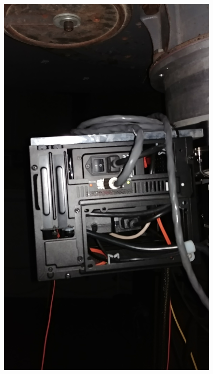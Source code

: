 \documentclass[12pt]{article}
\begin{document}
\begin{figure}[t!]
  \centering
  \begin{minipage}[b]{0.49\textwidth}
    \includegraphics[width=\textwidth]{power.jpg}
  \end{minipage}
  \hfill
  \begin{minipage}[b]{0.49\textwidth}

\end{minipage}
\end{figure}
\end{document}
